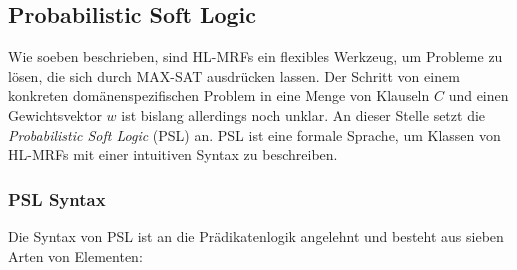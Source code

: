 \subsection{Probabilistic Soft Logic}%
\label{sec:theory:psl:psl}

Wie soeben beschrieben, sind HL-MRFs ein flexibles Werkzeug, um Probleme zu lösen, die sich durch MAX-SAT ausdrücken lassen.
Der Schritt von einem konkreten domänenspezifischen Problem in eine Menge von Klauseln $C$ und einen Gewichtsvektor $w$ ist bislang allerdings noch unklar.
An dieser Stelle setzt die \textit{Probabilistic Soft Logic} (PSL) an.
PSL ist eine formale Sprache, um Klassen von HL-MRFs mit einer intuitiven Syntax zu beschreiben.

\subsubsection{PSL Syntax}
Die Syntax von PSL ist an die Prädikatenlogik angelehnt und besteht aus sieben Arten von Elementen:
